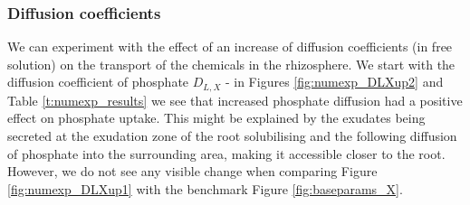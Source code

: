 \documentclass[11pt]{article}
\numberwithin{equation}{section}
\begin{document}
\subsubsection{Diffusion coefficients}
We can experiment with the effect of an increase of diffusion coefficients (in free solution) on the transport of the chemicals in the rhizosphere. We start with the diffusion coefficient of phosphate $D_{L,X}$ - in Figures \ref{fig:numexp_DLXup2} and Table \ref{t:numexp_results} we see that increased phosphate diffusion had a positive effect on phosphate uptake. This might be explained by the exudates being secreted at the exudation zone of the root solubilising  and the following diffusion of phosphate into the surrounding area, making it accessible closer to the root. However, we do not see any visible change when comparing Figure \ref{fig:numexp_DLXup1} with the benchmark Figure \ref{fig:baseparams_X}.
\end{document}
